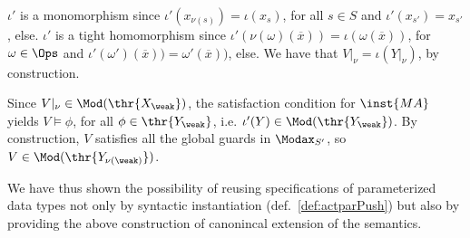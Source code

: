 \begin{PROOF}
$\iota'$ is a monomorphism since $\iota'(x_{\nu(s)}) = \iota(x_s)$, for all
$s \in S$ and $\iota'(x_{s'}) = x_{s'}$, else.  $\iota'$ is a tight
homomorphism since $\iota'(\nu(\omega)(\overline{x})) =
\iota(\omega(\overline{x}))$, for $\omega \in \Ops$ and
$\iota'(\omega')(\overline{x})) = \omega'(\overline{x}))$, else.  We have
that $V|_{\nu} = \iota(Y|_{\nu})$, by construction.

Since $V|_\nu \in \Mod(\thr{X_\weak})$, the satisfaction
condition for $\inst{MA}$ yields $V \models \phi$, for
all $\phi \in \thr{Y_{\weak}}$, i.e. $\iota'(Y) \in
\Mod(\thr{Y_\weak})$. By construction, $V$  satisfies all the global guards in
$\Modax_{S'}$, so $V\in\Mod(\thr{Y_{\nu(\weak)}})$.
\end{PROOF}
We have thus shown the possibility of reusing specifications of parameterized
data types not only by syntactic instantiation (def.~\ref{def:actparPush}) but
also by providing the above construction of canonincal extension of the
semantics. 

